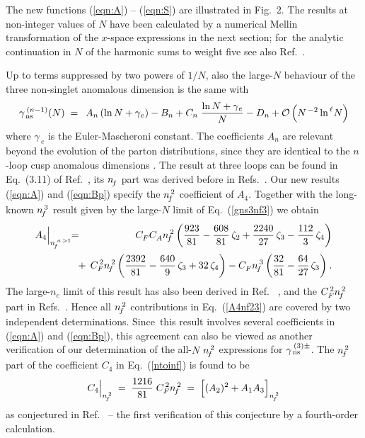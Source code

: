 \documentclass[12pt]{article}
\newcommand{\hspn}{{\hspace{-4mm}}}
\newcommand{\beq}{\begin{equation}}
\newcommand{\eeq}{\end{equation}}
\newcommand{\bea}{\begin{eqnarray}}
\newcommand{\eea}{\end{eqnarray}}
\newcommand{\nn}{\nonumber}
\begin{document}
The new functions (\ref{eqn:A}) -- (\ref{eqn:S}) are illustrated in Fig.~2.
The results at non-integer values of $N$ have been calculated by a numerical
Mellin transformation of the $x$-space expressions in the next section; 
for~the analytic continuation in $N$ of the harmonic sums to weight five 
see also 
Ref.~\cite{JBsums5}.

Up to terms suppressed by two powers of $1/N$, also the large-$N$ behaviour 
of the three non-singlet anomalous dimension is the same with
%
\beq
\label{ntoinf}
  \gamma_{\,\rm ns}^{\:(n-1)}(N) \; = \:\; 
    A_n \, (\ln N +\gamma_{\:\!e}) - B_n 
  + C_n \;\frac{\ln N + \gamma_{\:\!e}}{N} 
  - D_n + {\cal O} \left( {N^{\,-2} \ln^{\,\ell\!} N} \right)
\eeq
%
where $\gamma_{\:\!e}$ is the Euler-Mascheroni constant. 
The coefficients $A_n$ are relevant beyond the evolution of the parton 
distributions, since they are identical to the $n$-loop cusp anomalous 
dimensions \cite{PvsCusp}. 
The result at three loops can be found in Eq.~(3.11) of Ref.~\cite{mvvPns}, 
its ${n^{}_{\! f}}$ part was derived before in Refs.~\cite{mvvNSnf,BergerA3nf}.
Our new results (\ref{eqn:A}) and (\ref{eqn:Bp}) specify the ${n^{\,2}_{\! f}}$
coefficient of $A_4$. Together with the long-known ${n^{\,3}_{\! f}}$ result 
\cite{LargeNf1,BB95nf} given by the large-$N$ limit of Eq.~(\ref{gns3nf3})
we obtain
%
\bea
\label{A4nf23}
           A_4 \Big|_{n_{\!f}^{\;a\,>1}}
  &\!\!=\!& 
           \cf \* \ca \* \nfs \* \left(
             \frac{923}{81}
           - \frac{608}{81}\,\* \z2
           + \frac{2240}{27}\,\* \z3
           - \frac{112}{3}\,\* \z4
           \right)
\nn \\[0.5mm] && \mbox{\hspn}
       +\: \cfs \* \nfs \* \left(
             \frac{2392}{81}
           - \frac{640}{9}\,\* \z3
           + 32\,\* \z4
           \right)
         - \cf \* \nft \* \left(
             \frac{32}{81}
           - \frac{64}{27}\,\* \z3
           \right)
\:\! .
\eea
%
The large-$n_c$ limit of this result has also been derived in Ref.~%
\cite{HSSS16}, and the ${C^{\, 2}_F} {n^{\,2}_{\! f}}$ part in Refs.\ \cite{GHKM15,GrozinLL}. 
Hence all ${n^{\,2}_{\! f}}$ contributions in Eq.~(\ref{A4nf23}) are covered by 
two independent determinations. Since~this result involves several 
coefficients in (\ref{eqn:A}) and (\ref{eqn:Bp}), this agreement can also
be viewed as another verification of our determination of the all-$N$ ${n^{\,2}_{\! f}}$
expressions for $\gamma_{\,\rm ns}^{\:(3)\pm}$.
%
The ${n^{\,2}_{\! f}}$ part of the coefficient $C_4$ in Eq.~(\ref{ntoinf}) 
is found to be
%
\beq
\label{C4nf2}
   C_4 \Big|_\nfs \;=\; \frac{1216}{81}\; \cfs \nfs
   \;=\; \Big[ (A_2)^2 + A_1 A_3 \Big]_\nfs
\eeq
%
as conjectured in Ref.~\cite{DMS05} -- 
the first verification of this conjecture by a fourth-order calculation.
\end{document}
